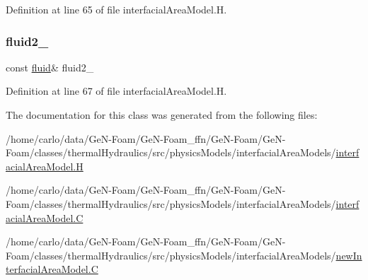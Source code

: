 Definition at line 65 of file interfacial\+Area\+Model.\+H.

\mbox{\label{classFoam_1_1interfacialAreaModel_a10350fa01c5980453030c19e26a2253f}} 
\subsubsection{\texorpdfstring{fluid2\+\_\+}{fluid2\_}}
{\footnotesize\ttfamily const \hyperlink{classFoam_1_1fluid}{fluid}\& fluid2\+\_\+\hspace{0.3cm}{\ttfamily [protected]}}



Definition at line 67 of file interfacial\+Area\+Model.\+H.



The documentation for this class was generated from the following files\+:\begin{DoxyCompactItemize}
\item 
/home/carlo/data/\+Ge\+N-\/\+Foam/\+Ge\+N-\/\+Foam\+\_\+ffn/\+Ge\+N-\/\+Foam/\+Ge\+N-\/\+Foam/classes/thermal\+Hydraulics/src/physics\+Models/interfacial\+Area\+Models/\hyperlink{interfacialAreaModel_8H}{interfacial\+Area\+Model.\+H}\item 
/home/carlo/data/\+Ge\+N-\/\+Foam/\+Ge\+N-\/\+Foam\+\_\+ffn/\+Ge\+N-\/\+Foam/\+Ge\+N-\/\+Foam/classes/thermal\+Hydraulics/src/physics\+Models/interfacial\+Area\+Models/\hyperlink{interfacialAreaModel_8C}{interfacial\+Area\+Model.\+C}\item 
/home/carlo/data/\+Ge\+N-\/\+Foam/\+Ge\+N-\/\+Foam\+\_\+ffn/\+Ge\+N-\/\+Foam/\+Ge\+N-\/\+Foam/classes/thermal\+Hydraulics/src/physics\+Models/interfacial\+Area\+Models/\hyperlink{newInterfacialAreaModel_8C}{new\+Interfacial\+Area\+Model.\+C}\end{DoxyCompactItemize}
